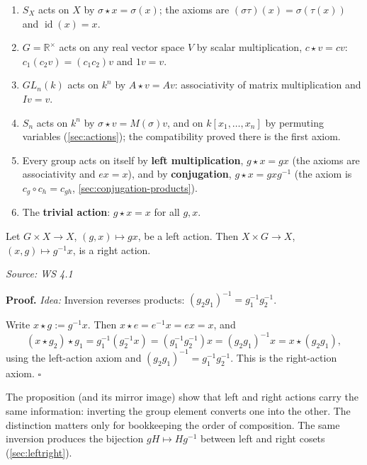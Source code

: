 \documentclass[11pt]{report}
\renewenvironment{proof}[1][Proof]{\noindent\textbf{#1.} }{\hfill$\square$\par\vspace{5pt}}
\newcommand{\srcline}[1]{\par\hfill{\footnotesize\textit{Source: #1}}}
\begin{document}
\begin{exbox}[Actions]\label{ex:actions}
\begin{enumerate}[nosep]
    \item $S_X$ acts on $X$ by $\sigma \star x = \sigma(x)$; the axioms are $(\sigma\tau)(x) = \sigma(\tau(x))$ and $\operatorname{id}(x) = x$.
    \item $G = \mathbb{R}^\times$ acts on any real vector space $V$ by scalar multiplication, $c \star v = cv$: $c_1(c_2 v) = (c_1 c_2)v$ and $1 v = v$.
    \item $GL_n(k)$ acts on $k^n$ by $A \star v = Av$: associativity of matrix multiplication and $I v = v$.
    \item $S_n$ acts on $k^n$ by $\sigma \star v = M(\sigma) v$, and on $k[x_1, \ldots, x_n]$ by permuting variables (\ref{sec:actions}); the compatibility proved there is the first axiom.
    \item Every group acts on itself by \textbf{left multiplication}, $g \star x = gx$ (the axioms are associativity and $ex = x$), and by \textbf{conjugation}, $g \star x = gxg^{-1}$ (the axiom is $c_g \circ c_h = c_{gh}$, \ref{sec:conjugation-products}).
    \item The \textbf{trivial action}: $g \star x = x$ for all $g, x$.
\end{enumerate}
\end{exbox}

\begin{propbox}\label{prop:left-action-gives-right-action}
Let $G \times X \to X$, $(g, x) \mapsto gx$, be a left action. Then $X \times G \to X$, $(x, g) \mapsto g^{-1}x$, is a right action.
\srcline{WS 4.1}
\end{propbox}

\begin{proof}
\textit{Idea:} Inversion reverses products: $(g_2g_1)^{-1} = g_1^{-1}g_2^{-1}$.\par
Write $x \star g := g^{-1}x$. Then $x \star e = e^{-1}x = ex = x$, and
\[ (x \star g_2) \star g_1 = g_1^{-1}(g_2^{-1} x) = (g_1^{-1}g_2^{-1})x = (g_2 g_1)^{-1} x = x \star (g_2 g_1), \]
using the left-action axiom and $(g_2g_1)^{-1} = g_1^{-1}g_2^{-1}$. This is the right-action axiom.
\end{proof}

\begin{rembox}\label{rem:left-right-interchangeable}
The proposition (and its mirror image) show that left and right actions carry the same information: inverting the group element converts one into the other. The distinction matters only for bookkeeping the order of composition. The same inversion produces the bijection $gH \mapsto Hg^{-1}$ between left and right cosets (\ref{sec:leftright}).
\end{rembox}
\end{document}
